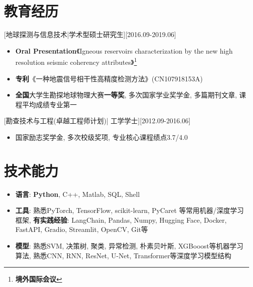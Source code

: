 \documentclass{resume}
\begin{document}


\ResumeTitle

\section{教育经历}
[\textnormal{地球探测与信息技术|}学术型硕士研究生][2016.09-2019.06]
\begin{itemize}
    \item \textbf{Oral Presentation}《Igneous reservoirs characterization by the new high resolution seismic coherency attributes》\protect\footnote{\textbf{境外国际会议}}
    \item \textbf{专利}《一种地震信号相干性高精度检测方法》(CN107918153A)
    \item \textbf{全国}大学生勘探地球物理大赛\textbf{一等奖}, 多次国家学业奖学金, 多篇期刊文章, 课程平均成绩专业第一
\end{itemize}
[\textnormal{勘查技术与工程(卓越工程师计划)|} 工学学士][2012.09-2016.06]
\begin{itemize}
    \item 国家励志奖学金, 多次校级奖项, 专业核心课程绩点3.7/4.0
\end{itemize}

\section{技术能力}
\begin{itemize}
    \item \textbf{语言}: \textbf{Python}, C++, Matlab, SQL, Shell
    \item \textbf{工具}: 熟悉PyTorch, TensorFlow, scikit-learn, PyCaret 等常用机器/深度学习框架, \textbf{有实践经验}: LangChain, Pandas, Numpy, Hugging Face, Docker, FastAPI, Gradio, Streamlit, OpenCV, Git等
    \item \textbf{模型}: 熟悉SVM, 决策树, 聚类, 异常检测, 朴素贝叶斯, XGBooost等机器学习算法, 熟悉CNN, RNN, ResNet, U-Net, Transformer等深度学习模型结构
\end{itemize}
\end{document}
